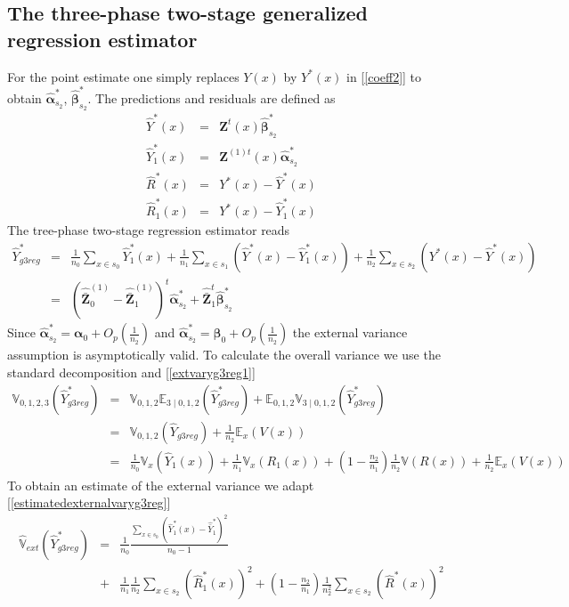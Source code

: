 \documentclass[a4paper,12pt,leqno, titlepage]{article}
\newcommand{\EX}{\mathbb{E}}
\newcommand{\VAR}{\mathbb{V}}
\begin{document}
\subsection{The three-phase two-stage generalized regression estimator}\label{threephasetwostageregest}
For the point estimate one simply replaces $Y(x)$ by $Y^*(x)$ in [\ref{coeff2}] to obtain $\hat{\pmb{\alpha}}_{s_2}^*$, $\hat{\pmb{\beta}}_{s_2}^*$. The predictions and residuals are defined as
\begin{eqnarray*}
\hat{Y}^*(x)&=&\pmb{Z}^t(x)\hat{\pmb{\beta}}^*_{s_2} \\ \hat{Y}^*_1(x)&=&\pmb{Z}^{(1)t}(x)\hat{\pmb{\alpha}}^*_{s_2}\\
\hat{R}^*(x)&=&Y^*(x)-\hat{Y}^*(x) \\
\hat{R}_1^*(x)&=&Y^*(x)-\hat{Y}_1^*(x)
\end{eqnarray*}
The tree-phase two-stage regression estimator reads
\begin{eqnarray}\label{yg3regtwostage}
\hat{Y}^*_{g3reg} &=& \frac{1}{n_0} \sum_{x\in{s_0}} \hat{Y}^*_1(x)
+\frac{1}{n_1}\sum_{x\in{s}_1}(\hat{Y}^*(x)-\hat{Y}^*_1(x))
+ \frac{1}{n_2}\sum_{x\in{s}_2}(Y^*(x)-\hat{Y}^*(x)) \nonumber \\
&=& (\hat{\bar{\pmb{Z}}}^{(1)}_0-\hat{\bar{\pmb{Z}}}^{(1)}_1)^t\hat{\pmb{\alpha}}^*_{s_2} +
\hat{\bar{\pmb{Z}}}^t_1\hat{\pmb{\beta}}^*_{s_2}
\end{eqnarray}
Since $\hat{\pmb{\alpha}}^*_{s_2}=\pmb{\alpha}_0 + O_p(\frac{1}{n_2})$ and $\hat{\pmb{\alpha}}^*_{s_2}=\pmb{\beta }_0 + O_p(\frac{1}{n_2})$ the external variance assumption is asymptotically valid. To calculate the overall variance we use the standard decomposition and [\ref{extvaryg3reg1}]
\begin{eqnarray}\label{extvary3regtwostage}
\VAR_{0,1,2,3}(\hat{Y}^*_{g3reg})&=&\VAR_{0,1,2}\EX_{3 \mid 0,1,2}(\hat{Y}^*_{g3reg})+\EX_{0,1,2}\VAR_{3 \mid 0,1,2}(\hat{Y}^*_{g3reg}) \nonumber \\
&=&\VAR_{0,1,2}(\hat{Y}_{g3reg})+\frac{1}{n_2}\EX_x (V(x))\nonumber \\
&=&\frac{1}{n_0}\VAR_{x}(\hat{Y}_1(x))+\frac{1}{n_1}\VAR_x(R_1(x))+
(1-\frac{n_2}{n_1})\frac{1}{n_2}\VAR(R(x))+ \frac{1}{n_2}\EX_x (V(x))
\end{eqnarray}
To obtain an estimate of the external variance we adapt [\ref{estimatedexternalvaryg3reg}]
\begin{eqnarray}\label{estexternvaryg3reg}
\hat{\VAR}_{ext}(\hat{Y}^*_{g3reg})&=&\frac{1}{n_0}\frac{\sum_{x\in{s_0}}(\hat{Y}^*_1(x)-\hat{\bar{Y}}^*_1)^2}{n_0-1}
\nonumber\\
&+&\frac{1}{n_1}\frac{1}{n_2}\sum_{x\in{s}_2}(\hat{R}^*_1(x))^2+
(1-\frac{n_2}{n_1})\frac{1}{n^2_2}\sum_{x\in{s}_2}(\hat{R}^*(x))^2
\end{eqnarray}
\end{document}
